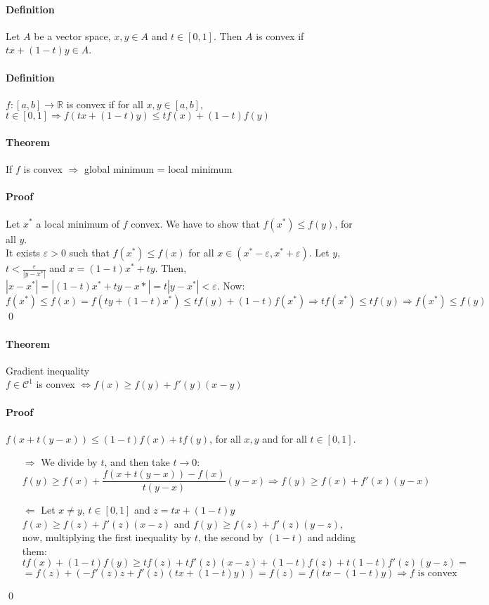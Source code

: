 \documentclass{article}
\newcommand{\functoR}[2]{#1 : #2 \rightarrow \mathbb{R}}
\newcommand{\intcc}[1]{\left[#1\right]}
\newcommand{\intoo}[1]{\left(#1\right)}
\newcommand{\C}{\mathcal{C}}
\newcommand{\Ep}{\varepsilon}
\newcommand{\Def}{\paragraph{Definition}}
\newcommand{\Theorem}{\paragraph{Theorem}}
\newcommand{\Proof}{\paragraph{Proof}}
\begin{document}
	\Def Let $A$ be a vector space, $x,y \in A$ and $t \in \intcc{0,1}$. Then $A$
	is convex if $tx + (1-t)y \in A$.

	\Def $\functoR{f}{\intcc{a,b}}$ is convex if for all $x,y \in \intcc{a,b}$,
	$t \in \intcc{0,1} \Rightarrow f(tx+(1-t)y) \leq tf(x) + (1-t)f(y)$

	\Theorem If $f$ is convex $\Rightarrow$ global minimum = local minimum

	\Proof Let $x^*$ a local minimum of $f$ convex. We have to show that $f(x^*)
	\leq f(y)$, for all $y$.
\\It exists $\Ep > 0$ such that $f(x^*) \leq f(x)$ for all $x \in
	\intoo{x^*-\Ep,x^*+\Ep}$. Let $y$, $t < \frac{\Ep}{|y-x^*|}$ and $x = (1-t)x^*
	+ ty$. Then, $|x-x^*| = |(1-t)x^*+ty-x*| = t|y-x^*| < \Ep$. Now:
	\begin{equation*}
		f(x^*) \leq f(x) = f(ty+(1-t)x^*) \leq tf(y) + (1-t)f(x^*) \Rightarrow
		tf(x^*) \leq tf(y) \Rightarrow f(x^*) \leq f(y)
	\end{equation*}
	\qed

	\Theorem Gradient inequality
\\$f \in \C^1$ is convex $\iff f(x) \geq f(y) + f'(y)(x-y)$

	\Proof $f(x+t(y-x)) \leq (1-t)f(x) + tf(y)$, for all $x,y$ and for all $t \in
	\intcc{0,1}$.
	\begin{itemize}
		\item[$\Rightarrow$] We divide by $t$, and then take $t \to 0$:
		\begin{equation*}
			f(y) \geq f(x) + \frac{f(x+t(y-x)) - f(x)}{t(y-x)}(y-x) \Rightarrow
			f(y) \geq f(x) + f'(x)(y-x)
		\end{equation*}

		\item[$\Leftarrow$] Let $x \neq y$, $t \in \intcc{0,1}$ and $z = tx+(1-t)y$
	\\$f(x) \geq f(z) + f'(z)(x-z)$ and $f(y) \geq f(z) + f'(z)(y-z)$, now,
		multiplying the first inequality by $t$, the second by $(1-t)$ and adding
		them:
		\begin{equation*}
			tf(x) + (1-t)f(y) \geq tf(z) + tf'(z)(x-z) + (1-t)f(z) + t(1-t)f'(z)(y-z)=
		\end{equation*}
		\begin{equation*} =
			f(z) + (-f'(z)z + f'(z)(tx+(1-t)y)) = f(z) = f(tx-(1-t)y) \Rightarrow
			f \text{ is convex}
		\end{equation*}
	\end{itemize}
	\qed
\end{document}
